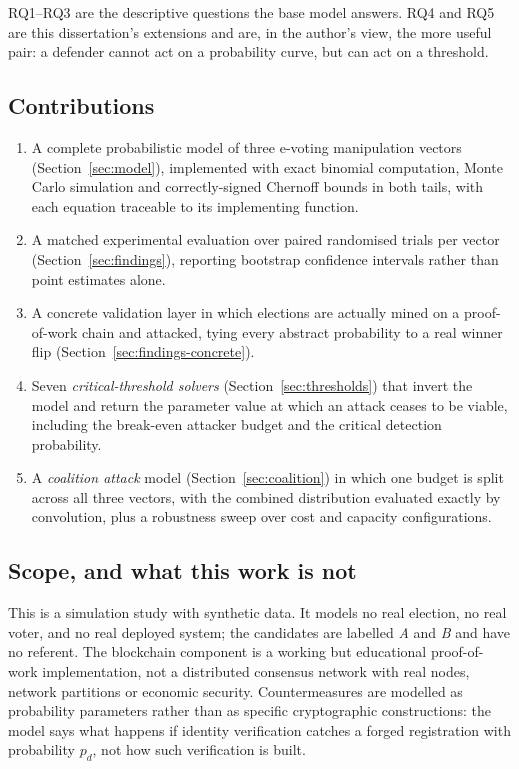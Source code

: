\documentclass[11pt,a4paper]{article}
\begin{document}
RQ1--RQ3 are the descriptive questions the base model answers. RQ4 and RQ5 are this
dissertation's extensions and are, in the author's view, the more useful pair: a
defender cannot act on a probability curve, but can act on a threshold.

\subsection{Contributions}

\begin{enumerate}[leftmargin=1.6em,itemsep=3pt]
  \item A complete probabilistic model of three e-voting manipulation vectors
        (Section~\ref{sec:model}), implemented with exact binomial computation,
        Monte Carlo simulation and correctly-signed Chernoff bounds in both tails,
        with each equation traceable to its implementing function.
  \item A matched experimental evaluation over \TotalTrials{} paired randomised trials
        per vector (Section~\ref{sec:findings}), reporting bootstrap confidence
        intervals rather than point estimates alone.
  \item A concrete validation layer in which \ElectionTrials{} elections are actually
        mined on a proof-of-work chain and attacked, tying every abstract probability
        to a real winner flip (Section~\ref{sec:findings-concrete}).
  \item Seven \emph{critical-threshold solvers} (Section~\ref{sec:thresholds}) that
        invert the model and return the parameter value at which an attack ceases to be
        viable, including the break-even attacker budget and the critical detection
        probability.
  \item A \emph{coalition attack} model (Section~\ref{sec:coalition}) in which one
        budget is split across all three vectors, with the combined distribution
        evaluated exactly by convolution, plus a robustness sweep over
        \SensitivityConfigs{} cost and capacity configurations.
\end{enumerate}

\subsection{Scope, and what this work is not}

This is a simulation study with synthetic data. It models no real election, no real
voter, and no real deployed system; the candidates are labelled \emph{A} and \emph{B}
and have no referent. The blockchain component is a working but educational
proof-of-work implementation, not a distributed consensus network with real nodes,
network partitions or economic security. Countermeasures are modelled as probability
parameters rather than as specific cryptographic constructions: the model says what
happens if identity verification catches a forged registration with probability $p_d$,
not how such verification is built.
\end{document}
